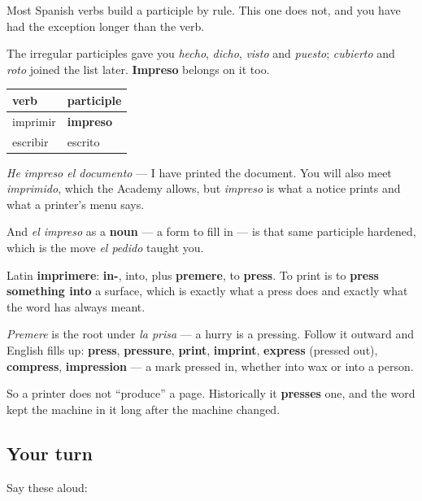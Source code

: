 \begin{grammarlens}[title={Grammar Lens: the participle you already hold}]
Most Spanish verbs build a participle by rule. This one does not, and you have had the exception longer than the verb.

The irregular participles gave you \emph{hecho}, \emph{dicho}, \emph{visto} and \emph{puesto}; \emph{cubierto} and \emph{roto} joined the list later. \textbf{Impreso} belongs on it too.

\noindent
\begin{tabularx}{\linewidth}{@{}>{\raggedright\arraybackslash}X>{\raggedright\arraybackslash}X@{}}
\toprule
\textbf{verb} & \textbf{participle} \\
\midrule
imprimir & \textbf{impreso} \\
escribir & escrito \\
\bottomrule
\end{tabularx}

\emph{He impreso el documento} — I have printed the document. You will also meet \emph{imprimido}, which the Academy allows, but \emph{impreso} is what a notice prints and what a printer's menu says.

And \emph{el impreso} as a \textbf{noun} — a form to fill in — is that same participle hardened, which is the move \emph{el pedido} taught you.
\end{grammarlens}

\begin{cousinweb}
Latin \textbf{imprimere}: \textbf{in-}, into, plus \textbf{premere}, to \textbf{press}. To print is to \textbf{press something into} a surface, which is exactly what a press does and exactly what the word has always meant.

\emph{Premere} is the root under \emph{la prisa} — a hurry is a pressing. Follow it outward and English fills up: \textbf{press}, \textbf{pressure}, \textbf{print}, \textbf{imprint}, \textbf{express} (pressed out), \textbf{compress}, \textbf{impression} — a mark pressed in, whether into wax or into a person.

So a printer does not \textquotedblleft{}produce\textquotedblright{} a page. Historically it \textbf{presses} one, and the word kept the machine in it long after the machine changed.
\end{cousinweb}

\subsection*{Your turn}
Say these aloud:

